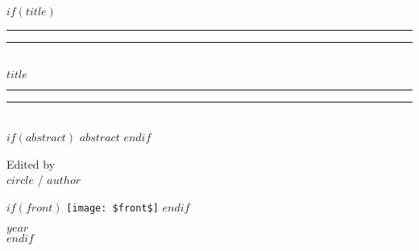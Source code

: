 $if(title)$
\begingroup

\centering %
\vspace*{\baselineskip} %

\rule{\textwidth}{1.6pt}\vspace*{-0.5\baselineskip}\vspace*{2pt} %
\rule{\textwidth}{0.4pt}\\[\baselineskip] %

{\huge $title$} \leavevmode\\[0.2\baselineskip] %

\rule{\textwidth}{0.4pt}\vspace*{-0.5\baselineskip}\vspace{3.2pt} %
\rule{\textwidth}{1.6pt}\\[\baselineskip] %

\scshape %
$if(abstract)$
{\Large $abstract$}
$endif$
\vspace*{2\baselineskip} %

{\large Edited by}  \leavevmode\\[\baselineskip]
{\Large $circle$ / $author$} %

$if(front)$
\vfill %
\texttt{[image: \$front\$]}
$endif$
\vfill* %

{\scshape }{\large $year$} \\[0.3\baselineskip] %

\thispagestyle{empty}
\blankpage
\afterpage{\blankpage}
\endgroup
$endif$
